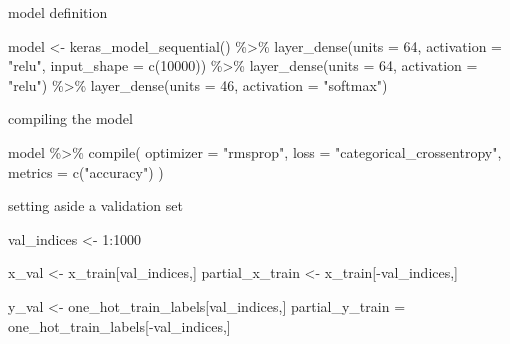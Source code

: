 \documentclass[]{article}
\newenvironment{Shaded}{\begin{snugshade}}{\end{snugshade}}
\newcommand{\AttributeTok}[1]{\textcolor[rgb]{0.77,0.63,0.00}{#1}}
\newcommand{\DecValTok}[1]{\textcolor[rgb]{0.00,0.00,0.81}{#1}}
\newcommand{\FunctionTok}[1]{\textcolor[rgb]{0.00,0.00,0.00}{#1}}
\newcommand{\NormalTok}[1]{#1}
\newcommand{\OtherTok}[1]{\textcolor[rgb]{0.56,0.35,0.01}{#1}}
\newcommand{\SpecialCharTok}[1]{\textcolor[rgb]{0.00,0.00,0.00}{#1}}
\newcommand{\StringTok}[1]{\textcolor[rgb]{0.31,0.60,0.02}{#1}}
\begin{document}
model definition

\begin{Shaded}
\begin{Highlighting}[]
\NormalTok{model }\OtherTok{\textless{}{-}} \FunctionTok{keras\_model\_sequential}\NormalTok{() }\SpecialCharTok{\%\textgreater{}\%}
  \FunctionTok{layer\_dense}\NormalTok{(}\AttributeTok{units =} \DecValTok{64}\NormalTok{, }\AttributeTok{activation =} \StringTok{"relu"}\NormalTok{, }\AttributeTok{input\_shape =} \FunctionTok{c}\NormalTok{(}\DecValTok{10000}\NormalTok{)) }\SpecialCharTok{\%\textgreater{}\%} 
  \FunctionTok{layer\_dense}\NormalTok{(}\AttributeTok{units =} \DecValTok{64}\NormalTok{, }\AttributeTok{activation =} \StringTok{"relu"}\NormalTok{) }\SpecialCharTok{\%\textgreater{}\%}
  \FunctionTok{layer\_dense}\NormalTok{(}\AttributeTok{units =} \DecValTok{46}\NormalTok{, }\AttributeTok{activation =} \StringTok{"softmax"}\NormalTok{)}
\end{Highlighting}
\end{Shaded}

compiling the model

\begin{Shaded}
\begin{Highlighting}[]
\NormalTok{model }\SpecialCharTok{\%\textgreater{}\%} \FunctionTok{compile}\NormalTok{(}
  \AttributeTok{optimizer =} \StringTok{"rmsprop"}\NormalTok{,}
  \AttributeTok{loss =} \StringTok{"categorical\_crossentropy"}\NormalTok{, }
  \AttributeTok{metrics =} \FunctionTok{c}\NormalTok{(}\StringTok{"accuracy"}\NormalTok{)}
\NormalTok{)}
\end{Highlighting}
\end{Shaded}

setting aside a validation set

\begin{Shaded}
\begin{Highlighting}[]
\NormalTok{val\_indices }\OtherTok{\textless{}{-}} \DecValTok{1}\SpecialCharTok{:}\DecValTok{1000}

\NormalTok{x\_val }\OtherTok{\textless{}{-}}\NormalTok{ x\_train[val\_indices,] }
\NormalTok{partial\_x\_train }\OtherTok{\textless{}{-}}\NormalTok{ x\_train[}\SpecialCharTok{{-}}\NormalTok{val\_indices,]}

\NormalTok{y\_val }\OtherTok{\textless{}{-}}\NormalTok{ one\_hot\_train\_labels[val\_indices,] }
\NormalTok{partial\_y\_train }\OtherTok{=}\NormalTok{ one\_hot\_train\_labels[}\SpecialCharTok{{-}}\NormalTok{val\_indices,]}
\end{Highlighting}
\end{Shaded}
\end{document}
